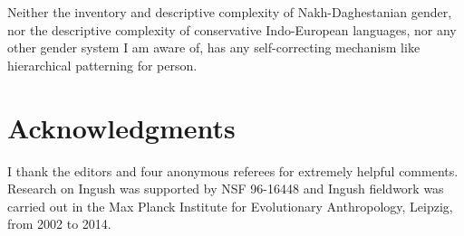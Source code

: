 \documentclass[output=collectionpaper]{langsci/langscibook}
\begin{document}
Neither the inventory and descriptive complexity of Nakh-Daghestanian gender, nor the descriptive complexity of conservative Indo-European languages, nor any other gender system I am aware of, has any self-correcting mechanism like hierarchical patterning for person.


\section*{Acknowledgments}
I thank the editors and four anonymous referees for extremely helpful comments. Research on Ingush was supported by NSF 96-16448 and Ingush fieldwork was carried out in the Max Planck Institute for Evolutionary Anthropology, Leipzig, from 2002 to 2014.

\printbibliography[heading=subbibliography,notkeyword=this]

\label{lastpage:Nichols}
\end{document}
